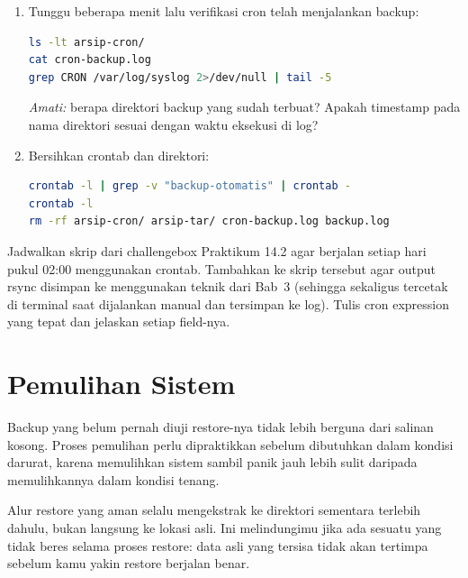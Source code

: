 \begin{enumerate}
    \item Tunggu beberapa menit lalu verifikasi cron telah menjalankan backup:
\begin{lstlisting}[language=bash, caption={Verifikasi eksekusi otomatis cron}]
ls -lt arsip-cron/
cat cron-backup.log
grep CRON /var/log/syslog 2>/dev/null | tail -5
\end{lstlisting}
    \textit{Amati:} berapa direktori backup yang sudah terbuat? Apakah timestamp
    pada nama direktori sesuai dengan waktu eksekusi di log?

    \item Bersihkan crontab dan direktori:
\begin{lstlisting}[language=bash, caption={Membersihkan crontab dan hasil backup}]
crontab -l | grep -v "backup-otomatis" | crontab -
crontab -l
rm -rf arsip-cron/ arsip-tar/ cron-backup.log backup.log
\end{lstlisting}
\end{enumerate}

\begin{challengebox}
Jadwalkan skrip  dari challengebox Praktikum 14.2
agar berjalan setiap hari pukul 02:00 menggunakan crontab. Tambahkan ke skrip
tersebut agar output rsync disimpan ke  menggunakan
teknik  dari Bab~3 (sehingga sekaligus tercetak di terminal saat
dijalankan manual dan tersimpan ke log). Tulis cron expression yang tepat dan
jelaskan setiap field-nya.
\end{challengebox}

\section{Pemulihan Sistem}
\label{sec:backup-recovery}

Backup yang belum pernah diuji restore-nya tidak lebih berguna dari salinan
kosong. Proses pemulihan perlu dipraktikkan sebelum dibutuhkan dalam kondisi
darurat, karena memulihkan sistem sambil panik jauh lebih sulit daripada
memulihkannya dalam kondisi tenang.

Alur restore yang aman selalu mengekstrak ke direktori sementara terlebih dahulu,
bukan langsung ke lokasi asli. Ini melindungimu jika ada sesuatu yang tidak
beres selama proses restore: data asli yang tersisa tidak akan tertimpa sebelum
kamu yakin restore berjalan benar.

